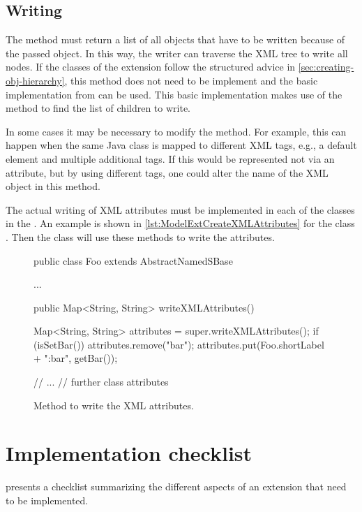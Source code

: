 \subsection{Writing}

The method   must return a list of all
objects that have to be written because of the passed object.  In this way,
the writer can traverse the XML tree to write all nodes. If the classes of the
extension follow the structured advice in \vref{sec:creating-obj-hierarchy}, this
method does not need to be implement and the basic implementation from 
can be used. This basic implementation makes use of the method 
to find the list of children to write.

In some cases it may be necessary to modify the 
method.  For example, this can happen when the same Java class is mapped to
different XML tags, e.g., a default element and multiple additional tags.
If this would be represented not via an attribute, but by using different
tags, one could alter the name of the XML object in this method.

The actual writing of XML attributes must be implemented in each of the
classes in the .  An example is shown in 
\vref{lst:ModelExtCreateXMLAttributes} for the class .
Then the  class will use these methods to write
the attributes.

\begin{figure}[htb]
  \begin{example}[numbers=left]
public class Foo extends AbstractNamedSBase {
  ...

  public Map<String, String> writeXMLAttributes() {
    Map<String, String> attributes = super.writeXMLAttributes();
    if (isSetBar()) {
      attributes.remove("bar");
      attributes.put(Foo.shortLabel + ":bar", getBar());
    }

    // ...
    // further class attributes
  }
}\end{example}
  \caption{Method to write the XML attributes.}
  \label{lst:ModelExtCreateXMLAttributes}
\end{figure}


\section{Implementation checklist}

 presents a checklist summarizing the different
aspects of an extension that need to be implemented.

